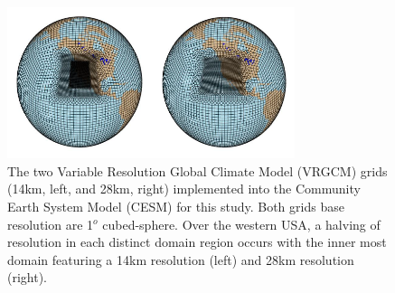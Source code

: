 \documentclass[11pt]{article}
\begin{document}
\begin{figure}
  \begin{center}
  \includegraphics[width=0.75\textwidth]{14kmand28kmgrids}
  \caption{The two Variable Resolution Global Climate Model (VRGCM) grids (14km, left, and 28km, right) implemented into the Community Earth System Model (CESM) for this study.  Both grids base resolution are 1$^{o}$ cubed-sphere.  Over the western USA, a halving of resolution in each distinct domain region occurs with the inner most domain featuring a 14km resolution (left) and 28km resolution (right).} \label{fig:CESMVarResMeshes}
  \end{center}
\end{figure}
\end{document}
